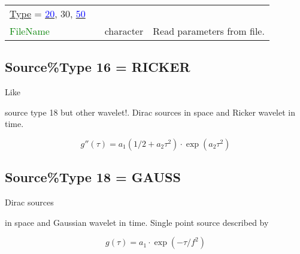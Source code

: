 \documentclass[12pt,twoside]{article}
\begin{document}
\begin{table}[H]
\begin{center}
\begin{tabular}{|p{4cm}|p{2.7cm}|p{2cm}|p{4cm}|}
\uline{Type} = \hyperlink{src20}{\textcolor{blue}{20}}, 30, \hyperlink{src50}{\textcolor{blue}{50}} & & &\\
\textcolor{green}{FileName} & & character & Read parameters from file.\\
\hline
\end{tabular}
\end{center}
\label{src2-table}
\end{table}


\newpage

\subsection{Source\%Type 16 = RICKER}
\hypertarget{src16}{Like} source type 18 but other wavelet!. 
Dirac sources in space and Ricker wavelet in time.

\begin{equation}
   g''(\tau) = a_1\left(1/2 + a_2 \tau^2 \right) \cdot \exp(a_2 \tau^2)
\end{equation}


\subsection{Source\%Type 18 = GAUSS}
\hypertarget{src18}{Dirac sources} in space and Gaussian wavelet in time.
Single point source described by

\begin{equation}
   g(\tau) = a_1 \cdot \exp(-\tau/f^2)
\end{equation}

% 
\end{document}

